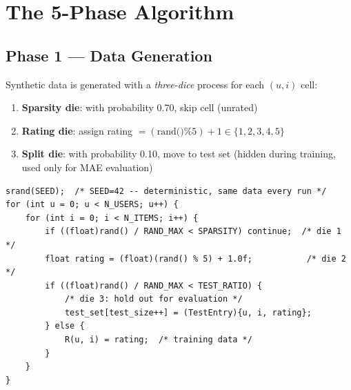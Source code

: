 \documentclass[12pt,a4paper]{article}
\begin{document}
\section{The 5-Phase Algorithm}

\begin{center}
\end{center}

\subsection{Phase 1 — Data Generation}

Synthetic data is generated with a \emph{three-dice} process for each
$(u, i)$ cell:

\begin{enumerate}
    \item \textbf{Sparsity die}: with probability 0.70, skip cell (unrated)
    \item \textbf{Rating die}: assign rating $= (\text{rand()} \% 5) + 1 \in \{1,2,3,4,5\}$
    \item \textbf{Split die}: with probability 0.10, move to test set (hidden
          during training, used only for MAE evaluation)
\end{enumerate}

\begin{lstlisting}
srand(SEED);  /* SEED=42 -- deterministic, same data every run */
for (int u = 0; u < N_USERS; u++) {
    for (int i = 0; i < N_ITEMS; i++) {
        if ((float)rand() / RAND_MAX < SPARSITY) continue;  /* die 1 */
        float rating = (float)(rand() % 5) + 1.0f;           /* die 2 */
        if ((float)rand() / RAND_MAX < TEST_RATIO) {
            /* die 3: hold out for evaluation */
            test_set[test_size++] = (TestEntry){u, i, rating};
        } else {
            R(u, i) = rating;  /* training data */
        }
    }
}
\end{lstlisting}
\end{document}
